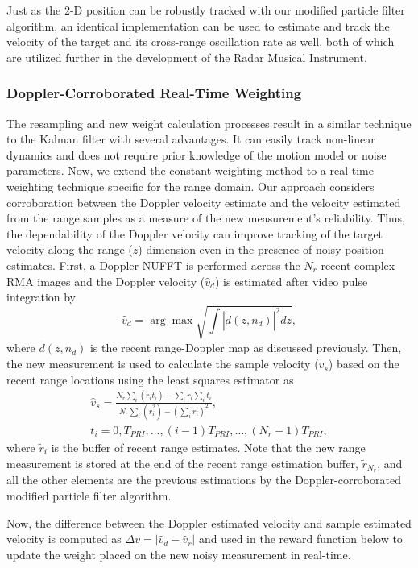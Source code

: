 \documentclass[10pt,journal,final]{IEEEtran}
\begin{document}
Just as the 2-D position can be robustly tracked with our modified particle filter algorithm, an identical implementation can be used to estimate and track the velocity of the target and its cross-range oscillation rate as well, both of which are utilized further in the development of the Radar Musical Instrument.

\subsubsection{Doppler-Corroborated Real-Time Weighting}
The resampling and new weight calculation processes result in a similar technique to the Kalman filter with several advantages. It can easily track non-linear dynamics and does not require prior knowledge of the motion model or noise parameters. Now, we extend the constant weighting method to a real-time weighting technique specific for the range domain.
Our approach considers corroboration between the Doppler velocity estimate and the velocity estimated from the range samples as a measure of the new measurement's reliability. Thus, the dependability of the Doppler velocity can improve tracking of the target velocity along the range ($z$) dimension even in the presence of noisy position estimates. First, a Doppler NUFFT is performed across the $N_r$ recent complex RMA images and the Doppler velocity ($\hat{v}_d$) is estimated after video pulse integration by
\begin{equation}
\label{eq:velocity_doppler}
	\hat{v}_d = \arg \max \sqrt{\int |\tilde{d}(z,n_d)|^2 dz},
\end{equation}
where $\tilde{d}(z,n_d)$ is the recent range-Doppler map as discussed previously. Then, the new measurement is used to calculate the sample velocity ($\hat{v}_s$) based on the recent range locations using the least squares estimator as
\begin{gather}
	\hat{v}_s = \frac{N_r \sum_i (\tilde{r}_i t_i) - \sum_i \tilde{r}_i \sum_i t_i}{N_r \sum_i (\tilde{r}_i^2) - \left( \sum_i \tilde{r}_i \right)^2}, \\
	t_i = 0, T_{PRI}, \dots , (i - 1)T_{PRI}, \dots , (N_r - 1)T_{PRI},
\end{gather}
where $\tilde{r}_i$ is the buffer of recent range estimates. Note that the new range measurement is stored at the end of the recent range estimation buffer, $\tilde{r}_{N_r}$, and all the other elements are the previous estimations by the Doppler-corroborated modified particle filter algorithm.

Now, the difference between the Doppler estimated velocity and sample estimated velocity is computed as $\Delta v = |\hat{v}_d - \hat{v}_r|$ and used in the reward function below to update the weight placed on the new noisy measurement in real-time. 
\end{document}
